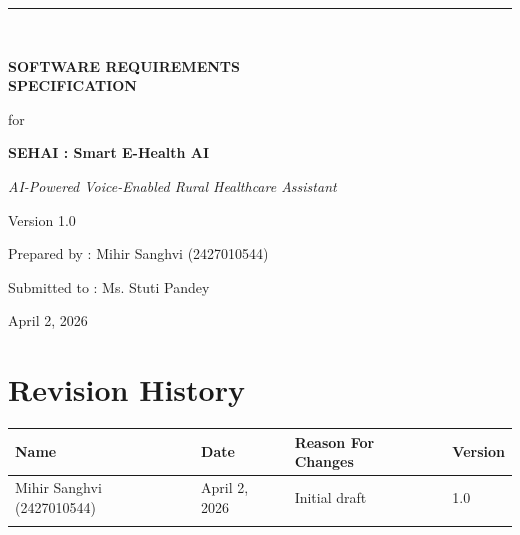 \documentclass[12pt,a4paper]{article}
\newcommand{\authorname}{Mihir Sanghvi (2427010544)}
\newcommand{\teachername}{Ms. Stuti Pandey}
\begin{document}
\begin{titlepage}
    \centering
    \vspace*{1.5cm}
    \rule{\linewidth}{2pt}\\[0.6cm]
    {\LARGE\bfseries SOFTWARE REQUIREMENTS\\[0.3cm] SPECIFICATION\par}
    \vspace{0.8cm}
    {\large for\par}
    \vspace{0.8cm}
    {\LARGE\bfseries SEHAI : Smart E-Health AI\par}
    \vspace{0.3cm}
    {\large\itshape AI-Powered Voice-Enabled Rural Healthcare Assistant\par}
    \vspace{1.8cm}
    {\normalsize Version 1.0\par}
    \vspace{1.2cm}
    {\normalsize Prepared by : \authorname\par}
    \vspace{0.8cm}
    {\normalsize Submitted to : \teachername\par}
    \vspace{0.8cm}
    {\normalsize April 2, 2026\par}
\end{titlepage}

\tableofcontents
\newpage

\section*{Revision History}

\begin{tabular}{|p{3.5cm}|p{2.5cm}|p{5.5cm}|p{2cm}|}
    \hline
    \textbf{Name} & \textbf{Date} & \textbf{Reason For Changes} & \textbf{Version} \\
    \hline
    \authorname & April 2, 2026 & Initial draft & 1.0 \\
    \hline
    & & & \\
    \hline
\end{tabular}

\newpage
\end{document}
